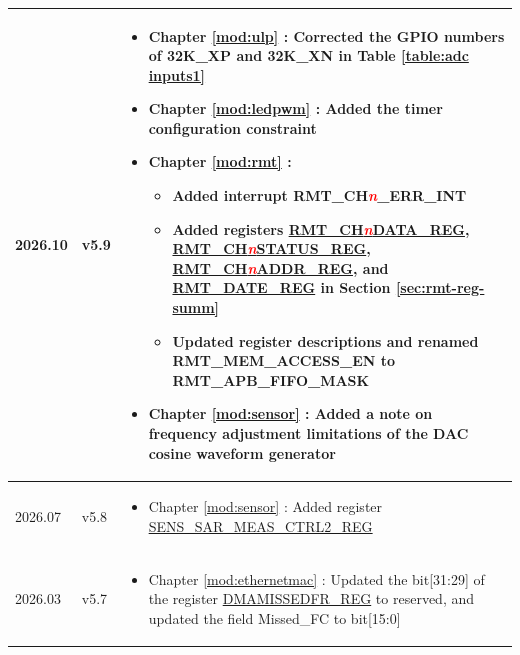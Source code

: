 \begin{longtable}[l]{ | m{2cm} | m{1.5cm} | m{12cm} | }
2026.10 & v5.9 &
\vspace{0.5em}
\begin{itemize}
    \item Chapter \ref{mod:ulp} \textit{\nameref{mod:ulp}}: Corrected the GPIO numbers of 32K\_XP and 32K\_XN in Table \ref{table:adc inputs1} \textit{\nameref{table:adc inputs1}} %
    \item Chapter \ref{mod:ledpwm} \textit{\nameref{mod:ledpwm}}: Added the timer configuration constraint %
    \item Chapter \ref{mod:rmt} \textit{\nameref{mod:rmt}}:
        \begin{itemize}
            \item Added interrupt RMT\_CH\textcolor{red}{\it{n}}\_ERR\_INT
            \item Added registers \hyperref[regdesc:RMTCHnDATAREG]{RMT\_CH\textcolor{red}{\it{n}}DATA\_REG}, \hyperref[regdesc:RMTCHnSTATUSREG]{RMT\_CH\textcolor{red}{\it{n}}STATUS\_REG}, \hyperref[regdesc:RMTCHnADDRREG]{RMT\_CH\textcolor{red}{\it{n}}ADDR\_REG}, and \hyperref[regdesc:RMTDATEREG]{RMT\_DATE\_REG} in Section \ref{sec:rmt-reg-summ} \textit{\nameref{sec:rmt-reg-summ}}
            \item Updated register descriptions and renamed RMT\_MEM\_ACCESS\_EN to RMT\_APB\_FIFO\_MASK
        \end{itemize}
    \item Chapter \ref{mod:sensor} \textit{\nameref{mod:sensor}}: Added a note on frequency adjustment limitations of the DAC cosine waveform generator
\end{itemize}
\vspace{-1em}
\\\hline
2026.07 & v5.8 &
\vspace{0.5em}
\begin{itemize}
    \item Chapter \ref{mod:sensor} \textit{\nameref{mod:sensor}}: Added register \hyperref[regdesc:SENSSARMEASCTRL2REG]{SENS\_SAR\_MEAS\_CTRL2\_REG} %
\end{itemize}
\vspace{-1em}
\\\hline
2026.03 & v5.7 &
\vspace{0.5em}
\begin{itemize}
    \item Chapter \ref{mod:ethernetmac} \textit{\nameref{mod:ethernetmac}}: Updated the bit[31:29] of the register \hyperref[regdesc:DMAMISSEDFRREG]{DMAMISSEDFR\_REG} to reserved, and updated the field Missed\_FC to bit[15:0] %
\end{itemize}
\vspace{-1em}
\\\hline


\end{longtable}
